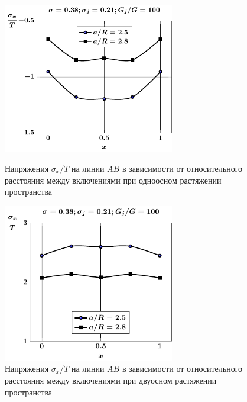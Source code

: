 \begin{figure}[h!]
\centering\footnotesize
\parbox[b]{7.5cm}{\centering\includegraphics[width=7.5cm]{inc13-a-d95-g100-t1-sig_x-ab.pdf}
\caption{Напряжения $\sigma_x/T$ на линии  $AB$ в зависимости от относительного расстояния между включениями при одноосном растяжении пространства
\label{f:8:72}}}\hfil\hfil
\parbox[b]{7.5cm}{\centering\includegraphics[width=7.5cm]{inc13-a-d95-g100-t2-sig_x-ab.pdf}
\caption{Напряжения $\sigma_x/T$ на линии  $AB$ в зависимости от относительного расстояния между включениями при двуосном растяжении пространства
\label{f:8:73}}}
\end{figure}


